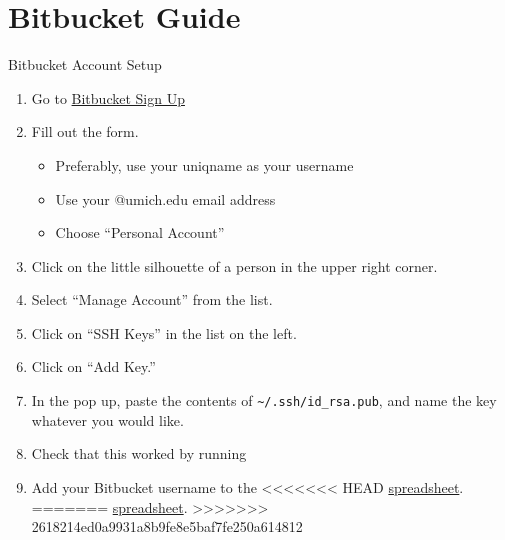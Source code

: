 \documentclass[table,dvipsnames]{beamer}
\begin{document}
\appendix

\section{Bitbucket Guide}
\begin{frame}[fragile,label=bitbucket]{Bitbucket Account Setup}
	\begin{enumerate}
		\item Go to \href{https://bitbucket.org/account/signup/}{Bitbucket Sign
			Up}
		\item Fill out the form.
			\begin{itemize}
				\item Preferably, use your uniqname as your username
				\item Use your @umich.edu email address
				\item Choose ``Personal Account''
			\end{itemize}
		\item Click on the little silhouette of a person in the upper right
			corner.
		\item Select ``Manage Account'' from the list.
		\item Click on ``SSH Keys'' in the list on the left.
		\item Click on ``Add Key.''
		\item In the pop up, paste the contents of
			\texttt{\~{}/.ssh/id\_rsa.pub}, and name the key whatever you would
			like.
		\item Check that this worked by running \\

		\item Add your Bitbucket username to the 
<<<<<<< HEAD
			\href{https://docs.google.com/spreadsheets/d/12jaY-aVehBuwxI1VhCA-kbMJyKsYOYu4JGXDU-4EdQs/edit?usp=sharing}{spreadsheet}.
=======
			\href{https://docs.google.com/spreadsheets/d/1N5EKp01RqMQF2hDmvTimF4kjQmUhuaGxmFt1uVJ_rUI/edit?usp=sharing}{spreadsheet}.
>>>>>>> 2618214ed0a9931a8b9fe8e5baf7fe250a614812
	\end{enumerate}
\end{frame}

\end{document}
